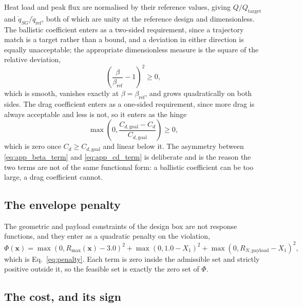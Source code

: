 Heat load and peak flux are normalised by their reference values, giving $Q/Q_{\mathrm{target}}$ and $\dot{q}_{SG}/\dot{q}_{\mathrm{ref}}$, both of which are unity at the reference design and dimensionless. The ballistic coefficient enters as a two-sided requirement, since a trajectory match is a target rather than a bound, and a deviation in either direction is equally unacceptable; the appropriate dimensionless measure is the square of the relative deviation,
\begin{equation}
    \left(\frac{\beta}{\beta_{\mathrm{ref}}} - 1\right)^{2} \ge 0 ,
    \label{eq:app_beta_term}
\end{equation}
which is smooth, vanishes exactly at $\beta = \beta_{\mathrm{ref}}$, and grows quadratically on both sides. The drag coefficient enters as a one-sided requirement, since more drag is always acceptable and less is not, so it enters as the hinge
\begin{equation}
    \max\!\left(0, \frac{C_{d,\mathrm{goal}} - C_d}{C_{d,\mathrm{goal}}}\right) \ge 0 ,
    \label{eq:app_cd_term}
\end{equation}
which is zero once $C_d \ge C_{d,\mathrm{goal}}$ and linear below it. The asymmetry between \eqref{eq:app_beta_term} and \eqref{eq:app_cd_term} is deliberate and is the reason the two terms are not of the same functional form: a ballistic coefficient can be too large, a drag coefficient cannot.

\subsection{The envelope penalty}

The geometric and payload constraints of the design box are not response functions, and they enter as a quadratic penalty on the violation,
\begin{equation}
    \Phi(\mathbf{x}) = \max\!\left(0, R_{\max}(\mathbf{x}) - 3.0\right)^{2} + \max\!\left(0, 1.0 - X_1\right)^{2} + \max\!\left(0, R_{N,\mathrm{payload}} - X_1\right)^{2} ,
    \label{eq:app_penalty}
\end{equation}
which is Eq.~\eqref{eq:penalty}. Each term is zero inside the admissible set and strictly positive outside it, so the feasible set is exactly the zero set of $\Phi$.

\subsection{The cost, and its sign}

